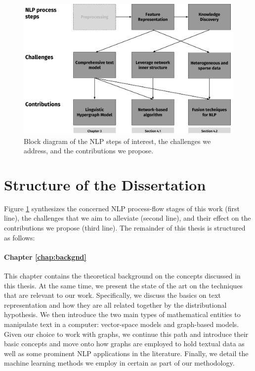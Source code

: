 \begin{figure}
\centering
\includegraphics[width=1\linewidth]{./images/Chapitre1/challenges_contribs.pdf}
\caption{Block diagram of the NLP steps of interest, the challenges we address, and the contributions we propose.}
\label{fig:challenges_contribs}
\end{figure}
\section{Structure of the Dissertation}

Figure \ref{fig:challenges_contribs} synthesizes the concerned NLP process-flow stages of this work (first line), the challenges that we aim to alleviate (second line), and their effect on the contributions we propose (third line). The remainder of this thesis is structured as follows:

\paragraph{Chapter \ref{chap:backgnd}} This chapter contains the theoretical background on the concepts discussed in this thesis. At the same time, we present the state of the art on the techniques that are relevant to our work. Specifically, we discuss the basics on text representation and how they are all related together by the distributional hypothesis. We then introduce the two main types of mathematical entities to manipulate text in a computer: vector-space models and graph-based models. Given our choice to work with graphs, we continue this path and introduce their basic concepts and move onto how graphs are employed to hold textual data as well as some prominent NLP applications in the literature. 
Finally, we detail the machine learning methods we employ in certain as part of our methodology. 

